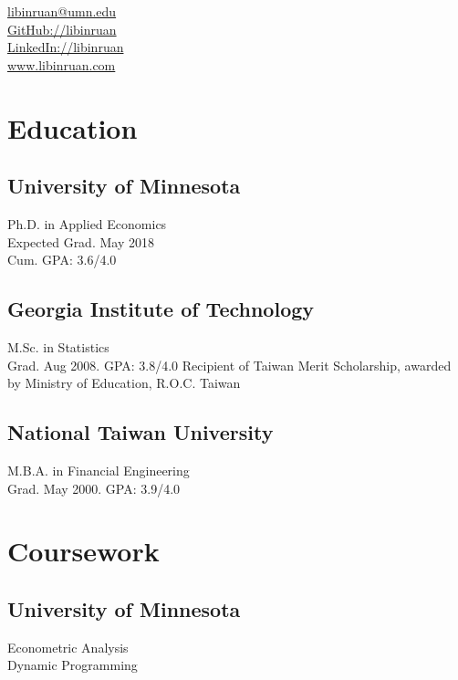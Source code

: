 \documentclass[]{hieudo-build}
\begin{document}
%
%
{
	\faEnvelope \href{mailto:libinruan@umn.edu}{ libinruan@umn.edu}\\
	\faGithub \href{https://github.com/libinruan}{   GitHub://libinruan}\\
	\faLinkedinSquare \href{https://www.linkedin.com/in/libinruan}{ LinkedIn://libinruan} \\
    \faHome \href{https://libinruan.com}{ www.libinruan.com}
}
    
%
%
\begin{minipage}[t]{0.34\textwidth} 

\section{Education} 

\subsection{University of Minnesota}
Ph.D. in Applied Economics \\
Expected Grad. May 2018 \\
Cum. GPA: 3.6/4.0\\
\sectionsep
\subsection{Georgia Institute of Technology}
M.Sc. in Statistics \\
Grad. Aug 2008. GPA: 3.8/4.0
Recipient of Taiwan Merit Scholarship, awarded by Ministry of Education, R.O.C. Taiwan
\sectionsep
\subsection{National Taiwan University}
M.B.A. in Financial Engineering \\
Grad. May 2000. GPA: 3.9/4.0

\section{Coursework}
\subsection{University of Minnesota}
Econometric Analysis \\
Dynamic Programming \\
\sectionsep

\end{minipage}
\end{document}

